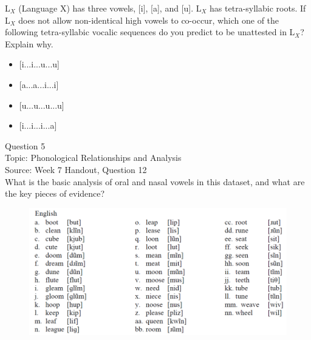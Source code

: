\documentclass[12pt]{article}
\begin{document}
L$_X$ (Language X) has three vowels, [i], [a], and [u]. L$_X$ has tetra-syllabic roots. If L$_X$ does not allow non-identical high vowels to co-occur, which one of the following tetra-syllabic vocalic sequences do you predict to be unattested in L$_X$? Explain why.\\

\begin{itemize} \item {[i...i...u...u]} \item {[a...a...i...i]} \item {[u...u...u...u]} \item {[i...i...i...a]} \end{itemize}


\newpage

{\large Question 5}\\

Topic: Phonological Relationships and Analysis\\
Source: Week 7 Handout, Question 12\\

What is the basic analysis of oral and nasal vowels in this dataset, and what are the key pieces of evidence?\\

\begin{figure}[H]
\includegraphics{../images/english12.png}
\end{figure}

\newpage

\begin{center}
\textbf{{\color{red}{\HUGE END OF EXAM}}}\\

\end{center}
\newpage

\begin{center}
\textbf{{\color{blue}{\HUGE START OF EXAM\\}}}

\textbf{{\color{blue}{\HUGE Student ID: 67575\\}}}

\textbf{{\color{blue}{\HUGE \\}}}

\end{center}
\newpage
\end{document}
